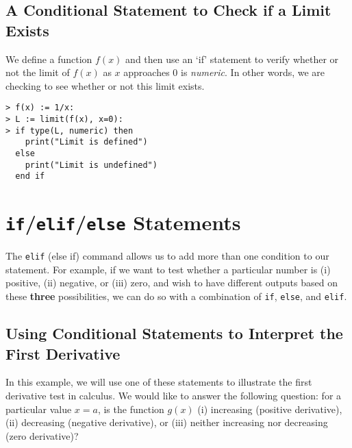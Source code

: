 \subsection{A Conditional Statement to Check if a Limit Exists}


We define a function $f(x)$ and then use an `if' statement to verify whether or not the limit of $f(x)$ as $x$ approaches $0$ is \textit{numeric}. In other words, we are checking to see whether or not this limit exists.

\begin{maplegroup}
\begin{mapleinput}
\begin{verbatim}
> f(x) := 1/x:
> L := limit(f(x), x=0):
> if type(L, numeric) then
    print("Limit is defined")
  else
    print("Limit is undefined")
  end if
\end{verbatim}
\end{mapleinput}
\mapleresult
{}
\begin{maplelatex}
\end{maplelatex}
\end{maplegroup}

\section{\texttt{if}/\texttt{elif}/\texttt{else} Statements}
\label{sec:if_elif_else_statements}


The \texttt{elif} (else if) command allows us to add more than one condition to our statement. For example, if we want to test whether a particular number is (i) positive, (ii) negative, or (iii) zero, and wish to have different outputs based on these \textbf{three} possibilities, we can do so with a combination of \texttt{if}, \texttt{else}, and \texttt{elif}.\\

\subsection{Using Conditional Statements to Interpret the First Derivative}
In this example, we will use one of these statements to illustrate the first derivative test in calculus. We would like to answer the following question: for a particular value $x=a$, is the function $g(x)$ (i) increasing (positive derivative), (ii) decreasing (negative derivative), or (iii) neither increasing nor decreasing (zero derivative)?

